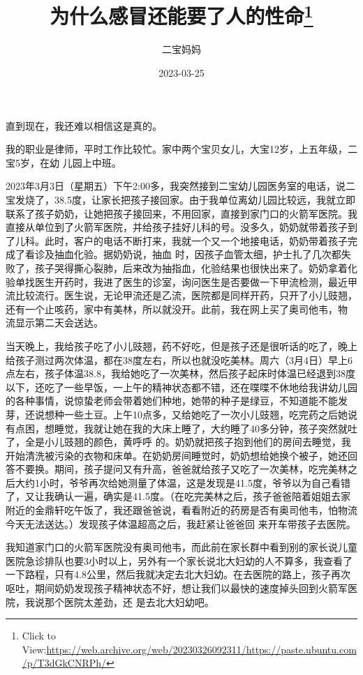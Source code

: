 \documentclass{article}
\title{为什么感冒还能要了人的性命\footnote{Click to View:\url{https://web.archive.org/web/20230326092311/https://paste.ubuntu.com/p/T3dGkCNRPh/}}}
\author{二宝妈妈}
\date{2023-03-25}
\begin{document}

\maketitle


\Large


﻿直到现在，我还难以相信这是真的。 

我的职业是律师，平时工作比较忙。家中两个宝贝女儿，大宝12岁，上五年级，二宝5岁，在幼
儿园上中班。 

2023年3月3日（星期五）下午2:00多，我突然接到二宝幼儿园医务室的电话，说二宝发烧了，38.5度，让家长把孩子接回家。由于我单位离幼儿园比较远，我就立即联系了孩子奶奶，让她把孩子接回来，不用回家，直接到家门口的火箭军医院。我直接从单位到了火箭军医院，并给孩子挂好儿科的号。没多久，奶奶就带着孩子到了儿科。此时，客户的电话不断打来，我就一个又一个地接电话，奶奶带着孩子完成了看诊及抽血化验。据奶奶说，抽血
\newpage
时，因孩子血管太细，护士扎了几次都失败了，孩子哭得撕心裂肺，后来改为抽指血，化验结果也很快出来了。奶奶拿着化验单找医生开药时，我进了医生的诊室，询问医生是否要做一下甲流检测，最近甲流比较流行。医生说，无论甲流还是乙流，医院都是同样开药，只开了小儿豉翘，还有一个止咳药，家中有美林，所以就没开。此前，我在网上买了奥司他韦，物
流显示第二天会送达。 

当天晚上，我给孩子吃了小儿豉翘，药不好吃，但是孩子还是很听话的吃了，晚上给孩子测过两次体温，都在38度左右，所以也就没吃美林。周六（3月4日）早上6点左右，孩子体温38.8，我给她吃了一次美林，然后孩子起床时体温已经退到38度以下，还吃了一些早饭，一上午的精神状态都不错，还在喋喋不休地给我讲幼儿园的各种事情，说惊蛰老师会带着她们种地，她带的种子是绿豆，不知道能不能发芽，还说想种一些土豆。上午10点多，又给她吃了一次小儿豉翘，吃完药之后她说有点困，想睡觉，我就让她在我的大床上睡了，大约睡了40多分钟，孩子突然就吐了，全是小儿豉翘的颜色，黄呼呼
\newpage
的。奶奶就把孩子抱到他们的房间去睡觉，我开始清洗被污染的衣物和床单。在奶奶房间睡觉时，奶奶想给她换个被子，她还回答不要换。期间，孩子提问又有升高，爸爸就给孩子又吃了一次美林，吃完美林之后大约1小时，爷爷再次给她测量了体温，这是发现是41.5度，爷爷以为自己看错了，又让我确认一遍，确实是41.5度。（在吃完美林之后，孩子爸爸陪着姐姐去家附近的金鼎轩吃午饭了，我还跟爸爸说，看看附近的药房是否有奥司他韦，怕物流今天无法送达。）发现孩子体温超高之后，我赶紧让爸爸回
来开车带孩子去医院。 

我知道家门口的火箭军医院没有奥司他韦，而此前在家长群中看到别的家长说儿童医院急诊排队也要3小时以上，另外有一个家长说北大妇幼的人不算多，我查看了一下路程，只有4.8公里，然后我就决定去北大妇幼。在去医院的路上，孩子再次呕吐，期间奶奶发现孩子精神状态不好，想让我们以最快的速度掉头回到火箭军医院，我说那个医院太差劲，还
是去北大妇幼吧。 
\end{document}
